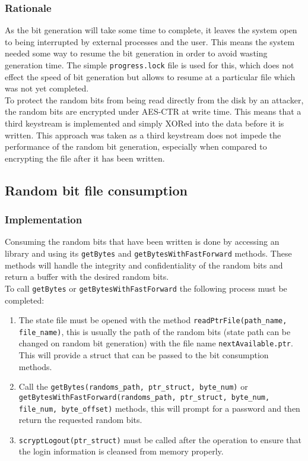 \documentclass{paper}
\begin{document}
				\subsubsection{Rationale}
					As the bit generation will take some time to complete, it leaves the system open to being interrupted by external processes and the user. This means the system needed some way to resume the bit generation in order to avoid wasting generation time. The simple \texttt{progress.lock} file is used for this, which does not effect the speed of bit generation but allows to resume at a particular file which was not yet completed.\\
					
					To protect the random bits from being read directly from the disk by an attacker, the random bits are encrypted under AES-CTR at write time. This means that a third keystream is implemented and simply XORed into the data before it is written. This approach was taken as a third keystream does not impede the performance of the random bit generation, especially when compared to encrypting the file after it has been written.\\
										

			\subsection{Random bit file consumption}
				\subsubsection{Implementation}
					Consuming the random bits that have been written is done by accessing an library and using its \texttt{getBytes} and \texttt{getBytesWithFastForward} methods. These methods will handle the integrity and confidentiality of the random bits and return a buffer with the desired random bits.\\
					
					To call \texttt{getBytes} or \texttt{getBytesWithFastForward} the following process must be completed:
					\begin{enumerate}
						\setlength\itemsep{-0.3em}
						\item The state file must be opened with the method \texttt{readPtrFile(path\_name, file\_name)}, this is usually the path of the random bits (state path can be changed on random bit generation) with the file name \texttt{nextAvailable.ptr}. This will provide a struct that can be passed to the bit consumption methods.
						\item Call the \texttt{getBytes(randoms\_path, ptr\_struct, byte\_num)} or \texttt{getBytesWithFastForward(randoms\_path, ptr\_struct, byte\_num, file\_num, byte\_offset)} methods, this will prompt for a password and then return the requested random bits.
						\item \texttt{scryptLogout(ptr\_struct)} must be called after the operation to ensure that the login information is cleansed from memory properly.
					\end{enumerate}
					
\end{document}

